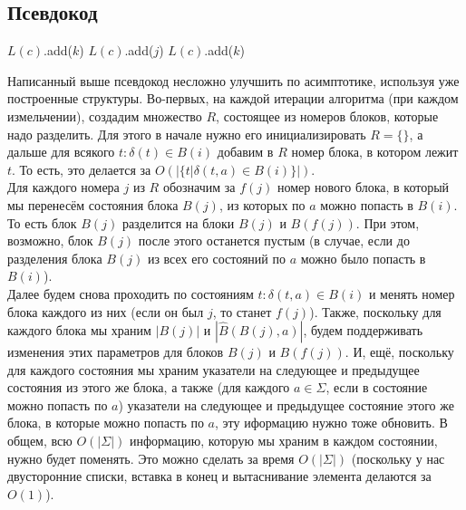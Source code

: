\documentclass{article}
\begin{document}
\subsection{Псевдокод}
\begin{algorithm}
  \begin{algorithmic}[1]

          \State $L(c)$.add($k$)
          \State $L(c)$.add($j$)
        \Else
          \State $L(c)$.add($k$)
        \EndIf
      \EndFor
    \EndIf
  \EndFor
  \EndWhile
  \end{algorithmic}
\end{algorithm}
Написанный выше псевдокод несложно улучшить по асимптотике, используя уже построенные структуры. Во-первых, на каждой итерации алгоритма (при каждом измельчении), создадим множество $R$, состоящее из номеров блоков, которые надо разделить. Для этого в начале нужно его инициализировать $R = \{\}$, а дальше для всякого $t: \delta(t) \in B(i)$ добавим в $R$ номер блока, в котором лежит $t$. То есть, это делается за $O(|\{t | \delta(t, a) \in B(i)\}|)$.\\
Для каждого номера $j$ из $R$ обозначим за $f(j)$ номер нового блока, в который мы перенесём состояния блока $B(j)$, из которых по $a$ можно попасть в $B(i)$. То есть блок $B(j)$ разделится на блоки $B(j)$ и $B(f(j))$. При этом, возможно, блок $B(j)$ после этого останется пустым (в случае, если до разделения блока $B(j)$ из всех его состояний по $a$ можно было попасть в $B(i)$).\\
Далее будем снова проходить по состояниям $t: \delta(t, a) \in B(i)$ и менять номер блока каждого из них (если он был $j$, то станет $f(j)$). Также, поскольку для каждого блока мы храним $|B(j)|$ и $|\hat B(B(j), a)|$, будем поддерживать изменения этих параметров для блоков $B(j)$ и $B(f(j))$. И, ещё, поскольку для каждого состояния мы храним указатели на следующее и предыдущее состояния из этого же блока, а также (для каждого $a \in \Sigma$, если в состояние можно попасть по $a$) указатели на следующее и предыдущее состояние этого же блока, в которые можно попасть по $a$, эту иформацию нужно тоже обновить. В общем, всю $O(|\Sigma|)$ информацию, которую мы храним в каждом состоянии, нужно будет поменять. Это можно сделать за время $O(|\Sigma|)$ (поскольку у нас двусторонние списки, вставка в конец и вытаснивание элемента делаются за $O(1)$).\\
\end{document}
